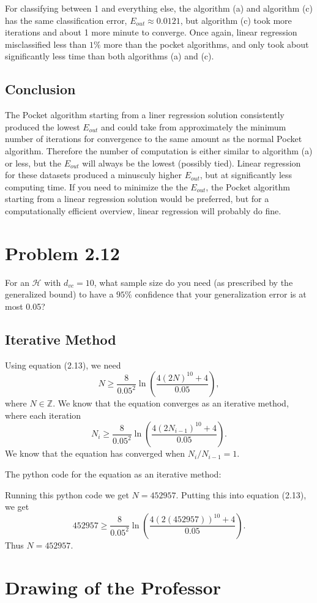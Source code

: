 \documentclass[a4paper]{article}
\begin{document}
\begin{doublespace}
For classifying between 1 and everything else, the algorithm (a) and algorithm (c) has the same classification error, $E_{out} \approx 0.0121$, but algorithm (c) took more iterations and about 1 more minute to converge. Once again, linear regression misclassified less than $1\%$ more than the pocket algorithms, and only took about significantly less time than both algorithms (a) and (c).

\subsection{Conclusion}

The Pocket algorithm starting from a liner regression solution consistently produced the lowest $E_{out}$ and could take from approximately the minimum number of iterations for convergence to the same amount as the normal Pocket algorithm. Therefore the number of computation is either similar to algorithm (a) or less, but the $E_{out}$ will always be the lowest (possibly tied). Linear regression for these datasets produced a minusculy higher $E_{out}$, but at significantly less computing time. If you need to minimize the the $E_{out}$, the Pocket algorithm starting from a linear regression solution would be preferred, but for a computationally efficient overview, linear regression will probably do fine.

\section{Problem 2.12}
For an $\mathcal{H}$ with $d_{vc} = 10$, what sample size do you need (as prescribed by the generalized bound) to have a $95\%$ confidence that your generalization error is at most 0.05?

\subsection{Iterative Method}
Using equation (2.13), we need
\[N \geq \frac{8}{0.05^2} \ln \left(\frac{4(2N)^{10}+4}{0.05}\right),\]
where $N \in \mathbb{Z}$. We know that the equation converges as an iterative method, where each iteration
\[N_i \geq \frac{8}{0.05^2} \ln \left(\frac{4(2N_{i-1})^{10}+4}{0.05}\right).\]
We know that the equation has converged when $N_i/N_{i-1} = 1$. 

\newpage

The python code for the equation as an iterative method:



Running this python code we get $N = 452957$. Putting this into equation (2.13), we get 
\[452957 \geq \frac{8}{0.05^2} \ln \left(\frac{4(2(452957))^{10}+4}{0.05}\right).\]
Thus $N = 452957$.

\newpage

\section{Drawing of the Professor}
\end{doublespace}
\end{document}
